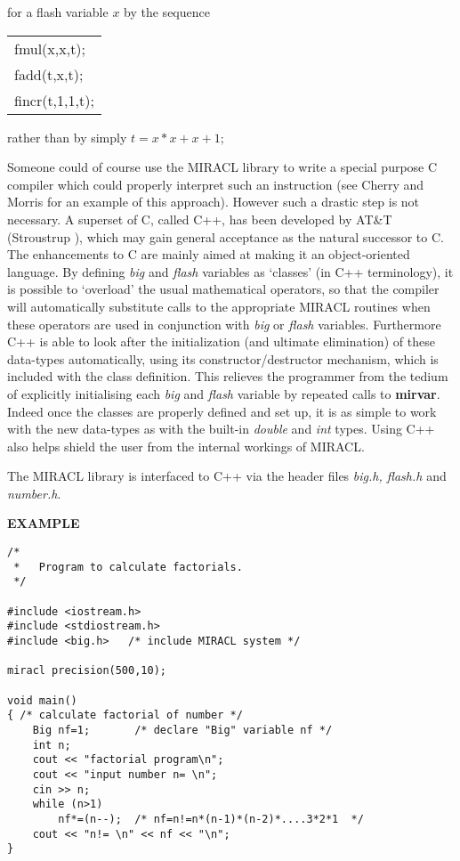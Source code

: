       for a flash variable $x$ by the sequence

      \begin{center}
      \begin{tabular}{l}
                            fmul(x,x,t);   \\
                            fadd(t,x,t);   \\
                            fincr(t,1,1,t);
      \end{tabular}
      \end{center}

      rather than by simply $t=x*x+x+1;$

      Someone  could  of  course  use the MIRACL library to write a special 
      purpose C compiler which could properly interpret such an instruction (see 
      Cherry and Morris \cite{Cherry} for an  example  of  this  approach).  However 
      such  a drastic step is not necessary.  A superset of C,  called C++, 
      has been developed by AT\&T (Stroustrup \cite{Strous}),  which may gain general 
      acceptance  as the natural successor to C.  The enhancements to C are 
      mainly aimed at making it an object-oriented  language.  By  defining 
      {\em big} and {\em flash} variables as `classes' (in C++ terminology), it 
      is possible to  `overload'  the usual mathematical operators, so 
      that the compiler will automatically substitute  calls  to  the  
      appropriate  MIRACL  routines  when these operators are used in 
      conjunction with {\em big}  or  {\em flash}  variables. Furthermore  C++  
      is able to look after the initialization (and ultimate 
      elimination) of these data-types  automatically,  using  its 
      constructor/destructor mechanism,  which is included with the class 
      definition. This relieves the programmer from the tedium of 
explicitly initialising each {\em big} and {\em flash} variable by repeated calls to 
{\bf mirvar}. 
      Indeed once the classes are properly defined and set up, 
      it  is as simple to work with the new data-types as with the 
      built-in {\em double} and {\em int} types. Using C++ also helps shield 
      the user from the internal workings of MIRACL.

      The MIRACL library is interfaced to C++ via the header files {\em 
      big.h, flash.h} and {\em number.h}. 

      \vspace{3mm}
      {\bf EXAMPLE}
      \vspace{3mm}
\begin{verbatim}
/*
 *   Program to calculate factorials.
 */

#include <iostream.h>
#include <stdiostream.h>
#include <big.h>   /* include MIRACL system */

miracl precision(500,10);

void main()
{ /* calculate factorial of number */
    Big nf=1;       /* declare "Big" variable nf */
    int n;
    cout << "factorial program\n";
    cout << "input number n= \n";
    cin >> n;
    while (n>1) 
        nf*=(n--);  /* nf=n!=n*(n-1)*(n-2)*....3*2*1  */
    cout << "n!= \n" << nf << "\n";
}

\end{verbatim} 


